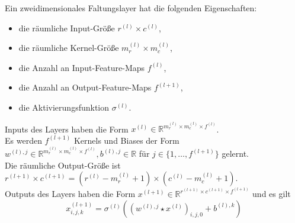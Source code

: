 \documentclass[envcountsect, smaller, aspectratio=149]{beamer}
\newcommand{\R}{\mathbb{R}}
\begin{document}
\begin{frame}
    \begin{definition}
        Ein zweidimensionales Faltungslayer hat die folgenden Eigenschaften:
        \begin{itemize}
            \item die räumliche Input-Größe $r^{(l)}\times c^{(l)}$,
            \item die räumliche Kernel-Größe $m_r^{(l)}\times m_c^{(l)}$,
            \item die Anzahl an Input-Feature-Maps $f^{(l)}$,
            \item die Anzahl an Output-Feature-Maps $f^{(l+1)}$,
            \item die Aktivierungsfunktion $\sigma^{(l)}$.
        \end{itemize}

        Inputs des Layers haben die Form $x^{(l)}\in\R^{m_r^{(l)}\times m_c^{(l)} \times f^{(l)}}$.\\[.4em]

        Es werden $f^{(l+1)}$ Kernels und Biases der Form $w^{(l),j}\in\R^{m_r^{(l)} \times m_c^{(l)} \times f^{(l)}}, b^{(l),j}\in\R$ für  $j\in\{1,\dots, f^{(l+1)}\}$ gelernt.\\[.4em]

        Die räumliche Output-Größe ist $r^{(l+1)} \times c^{(l+1)} = (r^{(l)}-  m_r^{(l)} + 1) \times (c^{(l)}-  m_c^{(l)} + 1) $.\\[.4em]

        Outputs des Layers haben die Form $x^{(l+1)}\in \R^{r^{(l+1)}\times c^{(l+1)} \times f^{(l+1)}}$ und es gilt
        \[
            x^{(l+1)}_{i,j,k} =  \sigma^{(l)}\left( (w^{(l),j} \star x^{(l)})_{i,j,0} + b^{(l),k} \right)
        \]
    \end{definition}
\end{frame}
\end{document}
